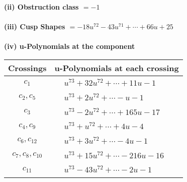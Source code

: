 \documentclass[1p]{elsarticle_modified}
\theoremstyle{definition}
\begin{document}
\flushleft \textbf{(ii) Obstruction class $= -1$}\\~\\
\flushleft \textbf{(iii) Cusp Shapes $= -18 u^{72}-43 u^{71}+\cdots+66 u+25$}\\~\\
\newpage\renewcommand{\arraystretch}{1}
\flushleft \textbf{(iv) u-Polynomials at the component}\newline \\
\begin{tabular}{m{50pt}|m{274pt}}
Crossings & \hspace{64pt}u-Polynomials at each crossing \\
\hline $$\begin{aligned}c_{1}\end{aligned}$$&$\begin{aligned}
&u^{73}+32 u^{72}+\cdots+11 u-1
\end{aligned}$\\
\hline $$\begin{aligned}c_{2},c_{5}\end{aligned}$$&$\begin{aligned}
&u^{73}+2 u^{72}+\cdots- u-1
\end{aligned}$\\
\hline $$\begin{aligned}c_{3}\end{aligned}$$&$\begin{aligned}
&u^{73}-2 u^{72}+\cdots+165 u-17
\end{aligned}$\\
\hline $$\begin{aligned}c_{4},c_{9}\end{aligned}$$&$\begin{aligned}
&u^{73}+u^{72}+\cdots+4 u-4
\end{aligned}$\\
\hline $$\begin{aligned}c_{6},c_{12}\end{aligned}$$&$\begin{aligned}
&u^{73}+3 u^{72}+\cdots-4 u-1
\end{aligned}$\\
\hline $$\begin{aligned}c_{7},c_{8},c_{10}\end{aligned}$$&$\begin{aligned}
&u^{73}+15 u^{72}+\cdots-216 u-16
\end{aligned}$\\
\hline $$\begin{aligned}c_{11}\end{aligned}$$&$\begin{aligned}
&u^{73}-43 u^{72}+\cdots-2 u-1
\end{aligned}$\\
\hline
\end{tabular}\\~\\
\end{document}
